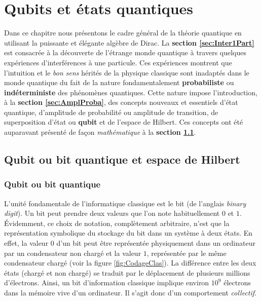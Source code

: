 
\chapter{Qubits et états quantiques}
\label{sec:AmplProb}
\minitoc

\bigskip


Dans ce chapitre nous présentons le cadre général de la théorie quantique en
utilisant la puissante et élégante algèbre de Dirac. La \textbf{section
\ref{sec:Inter1Part}} est consacrée à la découverte de l'étrange monde quantique
à travers quelques expériences d'interférences à une particule. Ces expériences
montrent que l'intuition et le \emph{bon sens} hérités de la physique classique
sont inadaptés dans le monde quantique du fait de la nature fondamentalement
\textbf{probabiliste} ou \textbf{indéterministe} des phénomènes quantiques.
Cette nature impose l'introduction, à la \textbf{section \ref{sec:AmplProba}},
des concepts nouveaux et essentiels d'état quantique, d'amplitude de probabilité
ou amplitude de transition, de superposition d'état ou \textbf{qubit} et de
l'espace de Hilbert. Ces concepts ont été auparavant présenté de façon
\emph{mathématique} à la \textbf{section \ref{sec:qbit}}.

\section{Qubit ou bit quantique et espace de Hilbert}
\label{sec:qbit}

\subsection{Qubit ou bit quantique}

L'unité fondamentale de l'informatique classique est le bit (de l'anglais
\emph{binary digit}). Un bit peut prendre deux valeurs que l'on note
habituellement $0$ et $1$. Évidemment, ce choix de notation, complètement
arbitraire, n'est que la représentation symbolique du stockage du bit dans un
système à deux états. En effet, la valeur $0$ d'un bit peut être représentée
physiquement dans un ordinateur par un condensateur non chargé et la valeur $1$,
représentée par le même condensateur chargé (voir la figure
\ref{fig:CodageClas}). La différence entre les deux états (chargé et non chargé)
se traduit par le déplacement de plusieurs millions d'électrons. Ainsi, un bit
d'information classique implique environ $10^{9}$ électrons dans la mémoire vive
d'un ordinateur. Il s'agit donc d'un comportement \emph{collectif}.


